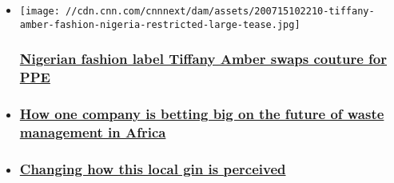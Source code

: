 \begin{itemize}
\item
  \href{/2020/07/20/africa/nigeria-fashion-tiffany-amber-coronavirus-ppe-spc-intl/index.html}{}

  \texttt{[image: //cdn.cnn.com/cnnnext/dam/assets/200715102210-tiffany-amber-fashion-nigeria-restricted-large-tease.jpg]}

  \hypertarget{nigerian-fashion-label-tiffany-amber-swaps-couture-for-ppe}{%
  \subsubsection{\texorpdfstring{\href{/2020/07/20/africa/nigeria-fashion-tiffany-amber-coronavirus-ppe-spc-intl/index.html}{Nigerian
  fashion label Tiffany Amber swaps couture for
  PPE}}{Nigerian fashion label Tiffany Amber swaps couture for PPE}}\label{nigerian-fashion-label-tiffany-amber-swaps-couture-for-ppe}}
\item
  \hypertarget{how-one-company-is-betting-big-on-the-future-of-waste-management-in-africa}{%
  \subsubsection{\texorpdfstring{\href{/videos/business/2020/05/18/marketplace-africa-rakesh-dudhat-waste-management-shree-hari-spc.cnn}{How
  one company is betting big on the future of waste management in
  Africa}}{How one company is betting big on the future of waste management in Africa}}\label{how-one-company-is-betting-big-on-the-future-of-waste-management-in-africa}}
\item
  \hypertarget{changing-how-this-local-gin-is-perceived}{%
  \subsubsection{\texorpdfstring{\href{/2020/07/07/africa/nigeria-local-gin-intl/index.html}{Changing
  how this local gin is
  perceived}}{Changing how this local gin is perceived}}\label{changing-how-this-local-gin-is-perceived}}
\end{itemize}

